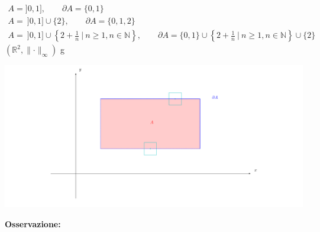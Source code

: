 \begin{exbar}
	\begin{gather*}
		A = ]0,1], \qquad \partial A = \{0,1\} 
		\\
		A = \ ]0,1] \cup \{ 2 \}, \qquad \partial A = \{ 0, 1, 2 \}
		\\
		A = \ ]0,1] \cup \left\{ 2 + \frac{1}{n} \ \bigg| \ n \geq 1, n \in \mathbb{N} \right\}, \qquad \partial A = \{0,1\} \cup \left\{2 + \frac{1}{n} \ \bigg| \ n \geq 1, n \in \mathbb{N} \right\} \cup \{ 2 \}
	\end{gather*}
$(\mathbb{R}^2, \parallel \cdot \parallel_\infty)$
g
\begin{center}
	\includegraphics[width=0.65\linewidth]{spazi_metrici_e_normati/pag148}
	\label{fig:pag148}
\end{center}
\end{exbar}


\textbf{Osservazione:}

